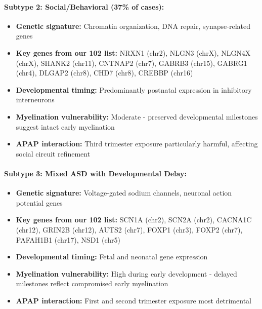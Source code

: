 \documentclass[11pt]{article}
\begin{document}
\paragraph{Subtype 2: Social/Behavioral (37\% of cases):}
\begin{itemize}
\item \textbf{Genetic signature:} Chromatin organization, DNA repair, synapse-related genes
\item \textbf{Key genes from our 102 list:} NRXN1 (chr2), NLGN3 (chrX), NLGN4X (chrX), SHANK2 (chr11), CNTNAP2 (chr7), GABRB3 (chr15), GABRG1 (chr4), DLGAP2 (chr8), CHD7 (chr8), CREBBP (chr16)
\item \textbf{Developmental timing:} Predominantly postnatal expression in inhibitory interneurons
\item \textbf{Myelination vulnerability:} Moderate - preserved developmental milestones suggest intact early myelination
\item \textbf{APAP interaction:} Third trimester exposure particularly harmful, affecting social circuit refinement
\end{itemize}


\paragraph{Subtype 3: Mixed ASD with Developmental Delay:}
\begin{itemize}
\item \textbf{Genetic signature:} Voltage-gated sodium channels, neuronal action potential genes
\item \textbf{Key genes from our 102 list:} SCN1A (chr2), SCN2A (chr2), CACNA1C (chr12), GRIN2B (chr12), AUTS2 (chr7), FOXP1 (chr3), FOXP2 (chr7), PAFAH1B1 (chr17), NSD1 (chr5)
\item \textbf{Developmental timing:} Fetal and neonatal gene expression
\item \textbf{Myelination vulnerability:} High during early development - delayed milestones reflect compromised early myelination
\item \textbf{APAP interaction:} First and second trimester exposure most detrimental
\end{itemize}
\end{document}
